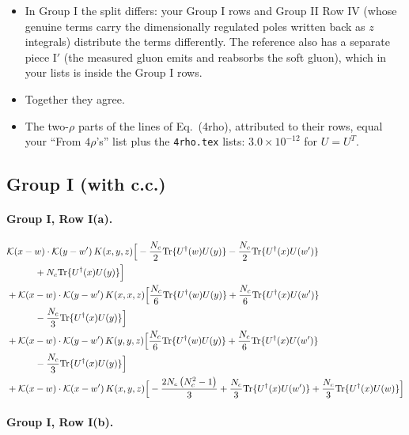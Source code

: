 \documentclass[10pt]{article}
\numberwithin{equation}{section}
\begin{document}
\begin{itemize}
\item In Group I the split differs: your Group I rows and Group II Row IV (whose genuine terms carry the dimensionally regulated poles written back as $z$ integrals) distribute the terms differently. The reference also has a separate piece I$'$ (the measured gluon emits and reabsorbs the soft gluon), which in your lists is inside the Group I rows.
\item Together they agree.
\item The two-$\rho$ parts of the lines of Eq.~(4rho), attributed to their rows, equal your ``From $4\rho$'s'' list plus the \texttt{4rho.tex} lists: $3.0\times10^{-12}$ for $U=U^T$.
\end{itemize}

\subsection{Group I (with c.c.)}

\paragraph{Group I, Row I(a).}

\begin{align}
&\mathcal K(x-w)\cdot\mathcal K(y-w')\,K(x,y,z)\Big[-\frac{N_c}{2}{\rm Tr}\{U^\dagger(w)U(y)\}-\frac{N_c}{2}{\rm Tr}\{U^\dagger(x)U(w')\}\notag\\
&\quad\quad\quad+N_c{\rm Tr}\{U^\dagger(x)U(y)\}\Big]\notag\\
&+\mathcal K(x-w)\cdot\mathcal K(y-w')\,K(x,x,z)\Big[\frac{N_c}{6}{\rm Tr}\{U^\dagger(w)U(y)\}+\frac{N_c}{6}{\rm Tr}\{U^\dagger(x)U(w')\}\notag\\
&\quad\quad\quad-\frac{N_c}{3}{\rm Tr}\{U^\dagger(x)U(y)\}\Big]\notag\\
&+\mathcal K(x-w)\cdot\mathcal K(y-w')\,K(y,y,z)\Big[\frac{N_c}{6}{\rm Tr}\{U^\dagger(w)U(y)\}+\frac{N_c}{6}{\rm Tr}\{U^\dagger(x)U(w')\}\notag\\
&\quad\quad\quad-\frac{N_c}{3}{\rm Tr}\{U^\dagger(x)U(y)\}\Big]\notag\\
&+\mathcal K(x-w)\cdot\mathcal K(x-w')\,K(x,y,z)\Big[-\frac{2 N_c \left(N_c^{2} - 1\right)}{3}+\frac{N_c}{3}{\rm Tr}\{U^\dagger(x)U(w')\}+\frac{N_c}{3}{\rm Tr}\{U^\dagger(x)U(w)\}\Big]
\label{eq:G1Ia}
\end{align}

\paragraph{Group I, Row I(b).}
\end{document}
